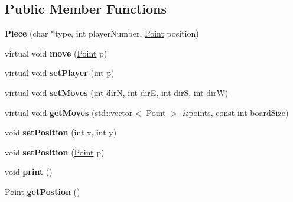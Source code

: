\subsection*{Public Member Functions}
\begin{DoxyCompactItemize}
\item 
\hypertarget{class_piece_af20b3f54c1dfafe3aac36bac2a0cafaf}{{\bfseries Piece} (char $\ast$type, int player\-Number, \hyperlink{struct_point}{Point} position)}\label{class_piece_af20b3f54c1dfafe3aac36bac2a0cafaf}

\item 
\hypertarget{class_piece_af0360ba66c38dc5f35b0de53653c0136}{virtual void {\bfseries move} (\hyperlink{struct_point}{Point} p)}\label{class_piece_af0360ba66c38dc5f35b0de53653c0136}

\item 
\hypertarget{class_piece_a84ba6ffb15c8e35be6a2eaa768a79d8c}{virtual void {\bfseries set\-Player} (int p)}\label{class_piece_a84ba6ffb15c8e35be6a2eaa768a79d8c}

\item 
\hypertarget{class_piece_aed124504a141b5920baf6919d7aa07a1}{virtual void {\bfseries set\-Moves} (int dir\-N, int dir\-E, int dir\-S, int dir\-W)}\label{class_piece_aed124504a141b5920baf6919d7aa07a1}

\item 
\hypertarget{class_piece_a24d8dbf44002666b0cdbc82c3fe689c3}{virtual void {\bfseries get\-Moves} (std\-::vector$<$ \hyperlink{struct_point}{Point} $>$ \&points, const int board\-Size)}\label{class_piece_a24d8dbf44002666b0cdbc82c3fe689c3}

\item 
\hypertarget{class_piece_a72665a008584e735f6c04ce91038c7e4}{void {\bfseries set\-Position} (int x, int y)}\label{class_piece_a72665a008584e735f6c04ce91038c7e4}

\item 
\hypertarget{class_piece_a016d7fe7de3eda5e10ea1a0bda8900e8}{void {\bfseries set\-Position} (\hyperlink{struct_point}{Point} p)}\label{class_piece_a016d7fe7de3eda5e10ea1a0bda8900e8}

\item 
\hypertarget{class_piece_a6f756ed0481304973757272233addbd4}{void {\bfseries print} ()}\label{class_piece_a6f756ed0481304973757272233addbd4}

\item 
\hypertarget{class_piece_ab011e4ae76a47c8f5a57fed6ed3bc40c}{\hyperlink{struct_point}{Point} {\bfseries get\-Postion} ()}\label{class_piece_ab011e4ae76a47c8f5a57fed6ed3bc40c}


\end{DoxyCompactItemize}
